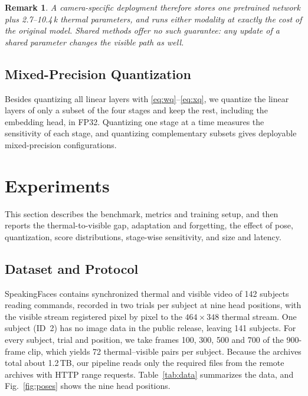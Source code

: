 \documentclass[journal]{IEEEtran}
\newtheorem{remark}{Remark}
\begin{document}
\begin{remark}
A camera-specific deployment therefore stores one pretrained network plus 2.7--10.4\,k thermal parameters, and runs either modality at exactly the cost of the original model. Shared methods offer no such guarantee: any update of a shared parameter changes the visible path as well.
\end{remark}

\subsection{Mixed-Precision Quantization}
Besides quantizing all linear layers with \eqref{eq:wq}--\eqref{eq:xq}, we quantize the linear layers of only a subset of the four stages and keep the rest, including the embedding head, in FP32. Quantizing one stage at a time measures the sensitivity of each stage, and quantizing complementary subsets gives deployable mixed-precision configurations.

\section{Experiments}
\label{sec:exp}
This section describes the benchmark, metrics and training setup, and then reports the thermal-to-visible gap, adaptation and forgetting, the effect of pose, quantization, score distributions, stage-wise sensitivity, and size and latency.

\subsection{Dataset and Protocol}
\label{sec:data}
SpeakingFaces \cite{abdrakhmanova2021speakingfaces} contains synchronized thermal and visible video of 142 subjects reading commands, recorded in two trials per subject at nine head positions, with the visible stream registered pixel by pixel to the $464\times348$ thermal stream. One subject (ID~2) has no image data in the public release, leaving 141 subjects. For every subject, trial and position, we take frames 100, 300, 500 and 700 of the 900-frame clip, which yields 72 thermal--visible pairs per subject. Because the archives total about 1.2\,TB, our pipeline reads only the required files from the remote archives with HTTP range requests. Table~\ref{tab:data} summarizes the data, and Fig.~\ref{fig:poses} shows the nine head positions.
\end{document}
